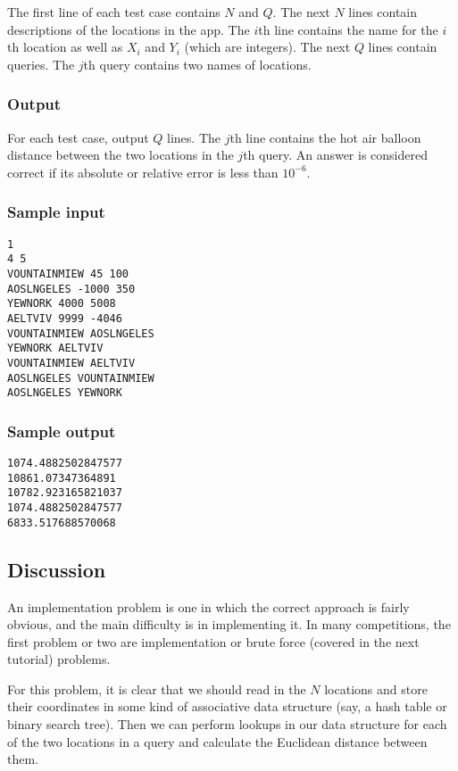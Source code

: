 The first line of each test case contains $N$ and $Q$. The next $N$ lines contain descriptions of the locations in the app. The $i$th line contains the name for the $i$th location as well as $X_i$ and $Y_i$ (which are integers). The next $Q$ lines contain queries. The $j$th query contains two names of locations.

\subsubsection*{Output}

For each test case, output $Q$ lines. The $j$th line contains the hot air balloon distance between the two locations in the $j$th query. An answer is considered correct if its absolute or relative error is less than $10^{-6}$.

\subsubsection*{Sample input}

\begin{verbatim}
1
4 5
VOUNTAINMIEW 45 100
AOSLNGELES -1000 350
YEWNORK 4000 5008
AELTVIV 9999 -4046
VOUNTAINMIEW AOSLNGELES
YEWNORK AELTVIV
VOUNTAINMIEW AELTVIV
AOSLNGELES VOUNTAINMIEW
AOSLNGELES YEWNORK
\end{verbatim}

\subsubsection*{Sample output}

\begin{verbatim}
1074.4882502847577
10861.07347364891
10782.923165821037
1074.4882502847577
6833.517688570068
\end{verbatim}

\subsection*{Discussion}

An implementation problem is one in which the correct approach is fairly obvious, and the main difficulty is in implementing it. In many competitions, the first problem or two are implementation or brute force (covered in the next tutorial) problems.

For this problem, it is clear that we should read in the $N$ locations and store their coordinates in some kind of associative data structure (say, a hash table or binary search tree). Then we can perform lookups in our data structure for each of the two locations in a query and calculate the Euclidean distance between them.

